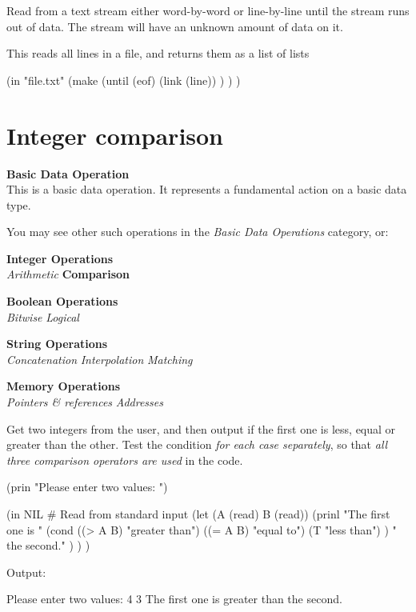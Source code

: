Read from a text stream either word-by-word or line-by-line until the
stream runs out of data. The stream will have an unknown amount of data
on it.

\begin{wideverbatim}

This reads all lines in a file, and returns them as a list of lists

(in "file.txt"
   (make
      (until (eof)
         (link (line)) ) ) )

\end{wideverbatim}

\pagebreak{}
\section*{Integer comparison}

\textbf{Basic Data Operation}\\ This is a basic data operation. It
represents a fundamental action on a basic data type.

You may see other such operations in the \emph{Basic Data Operations}
category, or:

\textbf{Integer Operations} \\
\emph{Arithmetic} \textbar{} \textbf{Comparison}

\textbf{Boolean Operations} \\ \emph{Bitwise} \textbar{}
\emph{Logical}

\textbf{String Operations} \\
\emph{Concatenation} \textbar{} \emph{Interpolation} \textbar{}
\emph{Matching}

\textbf{Memory Operations} \\
\emph{Pointers \& references} \textbar{} \emph{Addresses}

Get two integers from the user, and then output if the first one is
less, equal or greater than the other. Test the condition \emph{for each
case separately}, so that \emph{all three comparison operators are used}
in the code.

\begin{wideverbatim}

(prin "Please enter two values: ")

(in NIL  # Read from standard input
   (let (A (read) B (read))
      (prinl
         "The first one is "
         (cond
            ((> A B) "greater than")
            ((= A B) "equal to")
            (T "less than") )
         " the second." ) ) )

Output:

Please enter two values: 4 3
The first one is greater than the second.

\end{wideverbatim}

